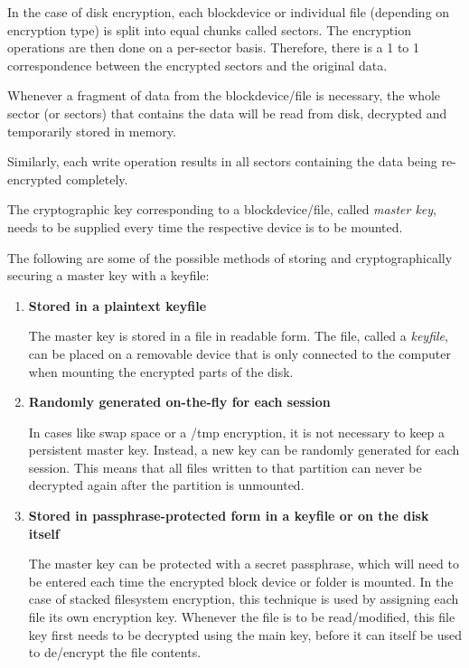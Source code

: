 In the case of disk encryption, each blockdevice or individual file (depending on encryption type) is split into equal chunks called sectors. The encryption operations are then done on a per-sector basis. Therefore, there is a 1 to 1 correspondence between the encrypted sectors and the original data.

Whenever a fragment of data from the blockdevice/file is necessary, the whole sector (or sectors) that contains the data will be read from disk, decrypted and temporarily stored in memory.

Similarly, each write operation results in all sectors containing the data being re-encrypted completely.

The cryptographic key corresponding to a blockdevice/file, called \textit{master key}, needs to be supplied every time the respective device is to be mounted.

The following are some of the possible methods of storing and cryptographically securing a master key with a keyfile\cite{disk-enc}:
\begin{enumerate}
\item \textbf{Stored in a plaintext keyfile}

The master key is stored in a file in readable form. The file, called a \textit{keyfile}, can be placed on a removable device that is only connected to the computer when mounting the encrypted parts of the disk.

\item \textbf{Randomly generated on-the-fly for each session}

In cases like swap space or a /tmp encryption, it is not necessary to keep a persistent master key. Instead, a new key can be randomly generated for each session. This means that all files written to that partition can never be decrypted again after the partition is unmounted.

\item \textbf{Stored in passphrase-protected form in a keyfile or on the disk itself}

The master key can be protected with a secret passphrase, which will need to be entered each time the encrypted block device or folder is mounted.
In the case of stacked filesystem encryption, this technique is used by assigning each file its own encryption key. Whenever the file is to be read/modified, this file key first needs to be decrypted using the main key, before it can itself be used to de/encrypt the file contents.

\end{enumerate}

